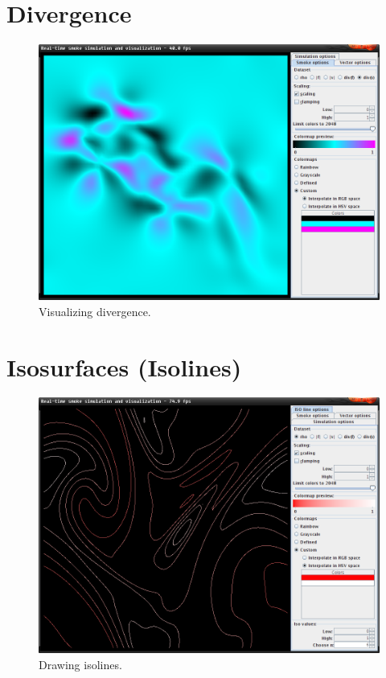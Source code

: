 \documentclass[a4paper,11pt,twoside]{report}
\begin{document}
	\section{Divergence}
		\begin{figure}[h]
		\centering
		\includegraphics[scale=\imagescalefactor]{images/step4.png}
		\caption{Visualizing divergence.}\label{fig:step4}
		\end{figure}
		\newpage
	\section{Isosurfaces (Isolines)}
		\begin{figure}[h]
		\centering
		\includegraphics[scale=\imagescalefactor]{images/step5.png}
		\caption{Drawing isolines.}\label{fig:step5}
		\end{figure}
		\newpage
\end{document}
